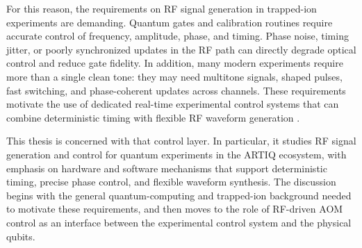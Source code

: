 For this reason, the requirements on RF signal generation in trapped-ion experiments are demanding. Quantum gates and calibration routines require accurate control of frequency, amplitude, phase, and timing. Phase noise, timing jitter, or poorly synchronized updates in the RF path can directly degrade optical control and reduce gate fidelity. In addition, many modern experiments require more than a single clean tone: they may need multitone signals, shaped pulses, fast switching, and phase-coherent updates across channels. These requirements motivate the use of dedicated real-time experimental control systems that can combine deterministic timing with flexible RF waveform generation \cite{bruzewicz2019,wineland1998}.

This thesis is concerned with that control layer. In particular, it studies RF signal generation and control for quantum experiments in the ARTIQ ecosystem, with emphasis on hardware and software mechanisms that support deterministic timing, precise phase control, and flexible waveform synthesis. The discussion begins with the general quantum-computing and trapped-ion background needed to motivate these requirements, and then moves to the role of RF-driven AOM control as an interface between the experimental control system and the physical qubits.

\label{ch:introduction}
